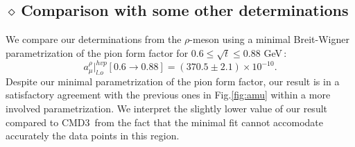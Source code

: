 \documentclass[review]{elsarticle}
\def\beq{\begin{equation}}
\def\eeq{\end{equation}}
\def\d{$\diamond~$}
\begin{document}
\subsection*{\hspace*{0.5cm}\d Comparison with some other determinations}
We compare our determinations from the $\rho$-meson using a minimal Breit-Wigner parametrization of the pion form factor for $0.6\leq \sqrt{t}\leq 0.88$ GeV\,:
\beq
a_\mu^{\rho}\vert^{hvp}_{l.o}[0.6\to 0.88]=(370.5\pm 2.1)\times 10^{-10}.
\label{eq:compare}
\eeq
 Despite our minimal parametrization of the pion form factor, our result is in a satisfactory agreement 
 with the previous ones in Fig.\ref{fig:amu} within  a more involved parametrization. We interpret the slightly lower value of our result compared to CMD3\,\cite{CMD3} from the fact that the minimal fit cannot accomodate accurately the data points in this region.  

\end{document}

